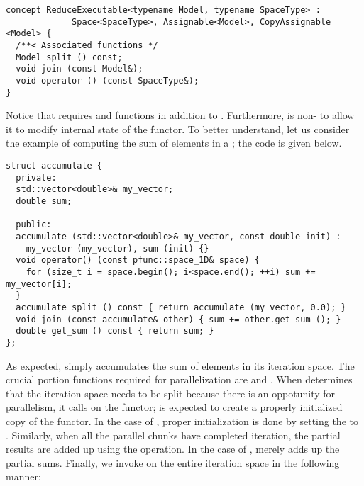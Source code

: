 \begin{center}
\begin{minipage}{0.8\textwidth}
\begin{lstlisting}
concept ReduceExecutable<typename Model, typename SpaceType> : 
             Space<SpaceType>, Assignable<Model>, CopyAssignable <Model> {
  /**< Associated functions */
  Model split () const;
  void join (const Model&);
  void operator () (const SpaceType&);
}
\end{lstlisting}
\end{minipage}
\end{center}
%
Notice that  requires  and  
functions in addition to .
%
Furthermore,  is non- to allow it to modify 
internal state of the functor.
%
To better understand, let us consider the example of computing the sum of 
elements in a ; the code is given below.
%
\begin{center}
\begin{minipage}{0.7\textwidth}
\begin{lstlisting}
struct accumulate {
  private:
  std::vector<double>& my_vector;
  double sum;

  public:
  accumulate (std::vector<double>& my_vector, const double init) :
    my_vector (my_vector), sum (init) {}
  void operator() (const pfunc::space_1D& space) {
    for (size_t i = space.begin(); i<space.end(); ++i) sum += my_vector[i];
  }
  accumulate split () const { return accumulate (my_vector, 0.0); }
  void join (const accumulate& other) { sum += other.get_sum (); }
  double get_sum () const { return sum; }
};
\end{lstlisting}
\end{minipage}
\end{center}
%
As expected,  simply accumulates the sum of elements in its 
iteration space.
%
The crucial portion functions required for parallelization are  
and .
%
When  determines that the iteration space needs 
to be split because there is an oppotunity for parallelism, it calls
 on the functor;  is expected to create a properly 
initialized copy of the functor.
%
In the case of , proper initialization is done by setting the 
 to .
%
Similarly, when all the parallel chunks have completed iteration, the partial 
results are added up using the  operation.
%
In the case of ,  merely adds up the partial 
sums. 
%
Finally, we invoke  on the entire iteration space
in the following manner:

